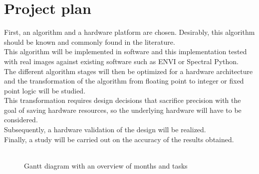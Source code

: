 \pagebreak
\section{Project plan}
First, an algorithm and a hardware platform are chosen. Desirably, this algorithm should be known and commonly found in the literature.
\\
This algorithm will be implemented in software and this implementation tested with real images against existing software such as ENVI or Spectral Python.
\\
The different algorithm stages will then be optimized for a hardware architecture and the transformation of the algorithm from floating point to integer or fixed point logic will be studied.
\\
This transformation requires design decisions that sacrifice precision with the goal of saving hardware resources, so the underlying hardware will have to be considered.
\\
Subsequently, a hardware validation of the design will be realized.
\\
Finally, a study will be carried out on the accuracy of the results obtained.
\\
\\
    \begin{figure}[h!]
    \caption[Gantt diagramm of this work]{Gantt diagram with an overview of months and tasks}
    \label{fig:gantt}
    \end{figure}
